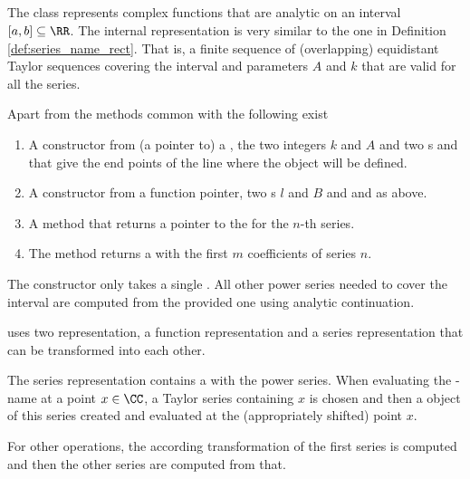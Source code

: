 	\subsection{\anarect}
		The class \anarect represents complex functions that are analytic on an interval $[a, b] \subseteq \RR$.
		The internal representation is very similar to the one in Definition \ref{def:series_name_rect}.
		That is, a finite sequence of (overlapping) equidistant Taylor sequences covering the interval and parameters $A$ and $k$ 
		that are valid for all the series.

		Apart from the methods common with \baana the following exist
		\begin{enumerate}
      \item A constructor from (a pointer to) a \powerseries, the two integers $k$ and $A$ and two {\real}s  and 
            that give the end points of the line where the \anarect object will be defined.
      \item A constructor from a function pointer, two s $l$ and $B$ and  and  as above.
      \item A method  that returns a pointer to the \powerseries for the $n$-th series.
      \item The method  returns a \poly with the first $m$ coefficients of series $n$. 
		\end{enumerate}
		The constructor only takes a single \powerseries.
		All other power series needed to cover the interval are computed from the provided one using analytic 
		continuation.  

		\anarect uses two representation, a function representation  and a series representation  that can be transformed into each other.

		The series representation  contains a  with the power series.
		When evaluating the -name at a point $x \in \CC$, 
		a Taylor series containing $x$ is chosen and then a \baana object of this series created and evaluated at 
		the (appropriately shifted) point $x$. 

		For other operations, the according transformation of the first series is computed and then the 
		other series are computed from that.    
